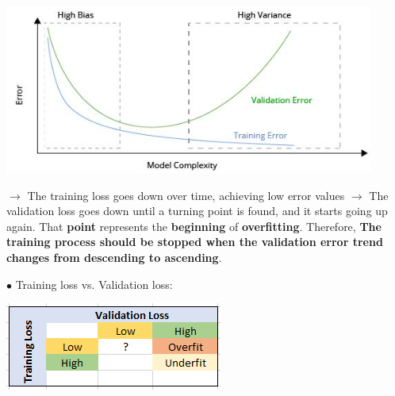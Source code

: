 \documentclass[letterpaper, 10.5pt,landscape]{article}
\begin{document}
\begin{multicols*}{3}
\begin{center}
    \begin{minipage}{0.8\linewidth}
        \includegraphics[width=\textwidth]{figures/Tradeoff_Learning_Curves.PNG}
    \end{minipage}
\end{center}

$\rightarrow$ The training loss goes down over time, achieving low error values
$\rightarrow$ The validation loss goes down until a turning point is found, and it starts going up again. That \textbf{point} represents the \textbf{beginning} of \textbf{overfitting}. Therefore, \textbf{The training process should be stopped when the validation error trend changes from descending to ascending}.


\vspace{3pt}

$\bullet$ Training loss vs. Validation loss:
\vspace{-3pt}
\begin{center}
    \begin{minipage}{0.60\linewidth}
        \includegraphics[width=\textwidth]{figures/Training_Validation_Loss.PNG}
    \end{minipage}
\end{center}


\end{multicols*}
\end{document}
